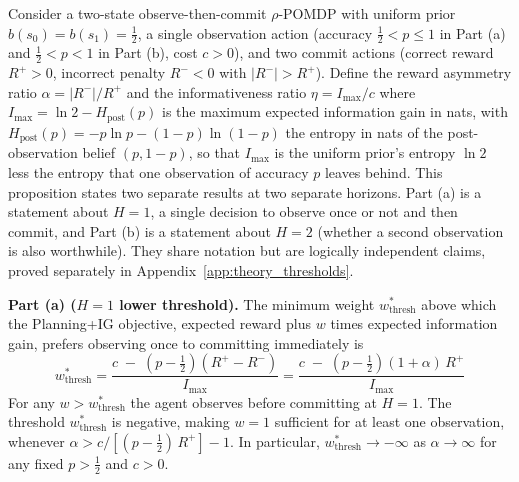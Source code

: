 \begin{proposition}
\label{prop:nearopt}
Consider a two-state observe-then-commit $\rho$-POMDP with uniform prior $b(s_0){=}b(s_1){=}\tfrac{1}{2}$, a single observation action (accuracy $\tfrac{1}{2} < p \le 1$ in Part (a) and $\tfrac{1}{2} < p < 1$ in Part (b), cost $c > 0$), and two commit actions (correct reward $R^+ > 0$, incorrect penalty $R^- < 0$ with $|R^-| > R^+$). Define the reward asymmetry ratio $\alpha = |R^-|/R^+$ and the informativeness ratio $\eta = I_{\max}/c$ where $I_{\max} = \ln 2 - H_{\text{post}}(p)$ is the maximum expected information gain in nats, with $H_{\text{post}}(p) = -p \ln p - (1-p)\ln(1-p)$ the entropy in nats of the post-observation belief $(p, 1-p)$, so that $I_{\max}$ is the uniform prior's entropy $\ln 2$ less the entropy that one observation of accuracy $p$ leaves behind. This proposition states two separate results at two separate horizons. Part (a) is a statement about $H{=}1$, a single decision to observe once or not and then commit, and Part (b) is a statement about $H{=}2$ (whether a second observation is also worthwhile). They share notation but are logically independent claims, proved separately in Appendix~\ref{app:theory_thresholds}.

\textbf{Part (a) ($H{=}1$ lower threshold).} The minimum weight $w^*_{\mathrm{thresh}}$ above which the Planning+IG objective, expected reward plus $w$ times expected information gain, prefers observing once to committing immediately is
\begin{equation*}
    w^*_{\mathrm{thresh}} = \frac{c \;-\; \left(p - \tfrac{1}{2}\right)(R^+ - R^-)}{\,I_{\max}\,} = \frac{c \;-\; \left(p - \tfrac{1}{2}\right)(1 + \alpha)\,R^+}{\,I_{\max}\,}
\end{equation*}
For any $w > w^*_{\mathrm{thresh}}$ the agent observes before committing at $H{=}1$. The threshold $w^*_{\mathrm{thresh}}$ is negative, making $w{=}1$ sufficient for at least one observation, whenever $\alpha > c / [(p - \tfrac{1}{2})\,R^+] - 1$. In particular, $w^*_{\mathrm{thresh}} \to -\infty$ as $\alpha \to \infty$ for any fixed $p > \tfrac{1}{2}$ and $c > 0$.


\end{proposition}
